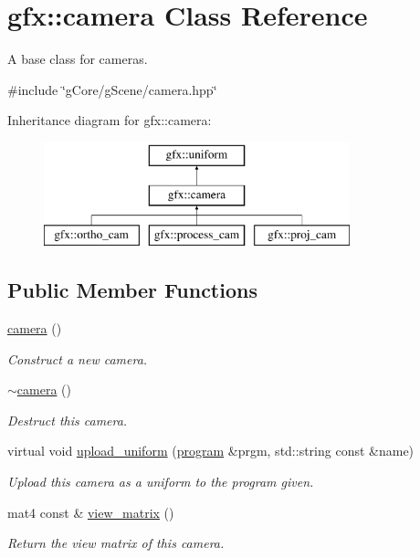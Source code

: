 \hypertarget{classgfx_1_1camera}{\section{gfx\-:\-:camera Class Reference}
\label{classgfx_1_1camera}
}


A base class for cameras.  




{\ttfamily \#include \char`\"{}g\-Core/g\-Scene/camera.\-hpp\char`\"{}}

Inheritance diagram for gfx\-:\-:camera\-:\begin{figure}[H]
\begin{center}
\leavevmode
\includegraphics[height=3.000000cm]{classgfx_1_1camera}
\end{center}
\end{figure}
\subsection*{Public Member Functions}
\begin{DoxyCompactItemize}
\item 
\hypertarget{classgfx_1_1camera_a79ba46c37d81a5607e3432eabb75ebd7}{\hyperlink{classgfx_1_1camera_a79ba46c37d81a5607e3432eabb75ebd7}{camera} ()}\label{classgfx_1_1camera_a79ba46c37d81a5607e3432eabb75ebd7}

\begin{DoxyCompactList}\small\item\em Construct a new camera. \end{DoxyCompactList}\item 
\hypertarget{classgfx_1_1camera_a2f2ce94351b2fa823cada43be12ab0c7}{\hyperlink{classgfx_1_1camera_a2f2ce94351b2fa823cada43be12ab0c7}{$\sim$camera} ()}\label{classgfx_1_1camera_a2f2ce94351b2fa823cada43be12ab0c7}

\begin{DoxyCompactList}\small\item\em Destruct this camera. \end{DoxyCompactList}\item 
virtual void \hyperlink{classgfx_1_1camera_a209884984c107ef76442b6408dc4f822}{upload\-\_\-uniform} (\hyperlink{classgfx_1_1program}{program} \&prgm, std\-::string const \&name)
\begin{DoxyCompactList}\small\item\em Upload this camera as a uniform to the program given. \end{DoxyCompactList}\item 
mat4 const \& \hyperlink{classgfx_1_1camera_a6c8a9dabd500a55ba6446836d9323aef}{view\-\_\-matrix} ()
\begin{DoxyCompactList}\small\item\em Return the view matrix of this camera. \end{DoxyCompactList}\end{DoxyCompactItemize}
